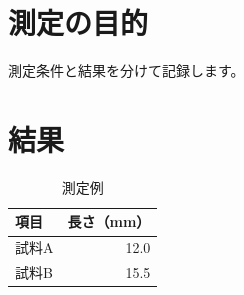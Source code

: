 \documentclass[a4paper,10pt]{ltjsarticle}
\begin{document}
\section{測定の目的}
測定条件と結果を分けて記録します。
\section{結果}
\begin{table}[htbp]
  \centering
  \caption{測定例}
  \begin{tabular}{lr}
    \toprule
    項目 & 長さ（mm） \\
    \midrule
    試料A & 12.0 \\
    試料B & 15.5 \\
    \bottomrule
  \end{tabular}
\end{table}
\end{document}
